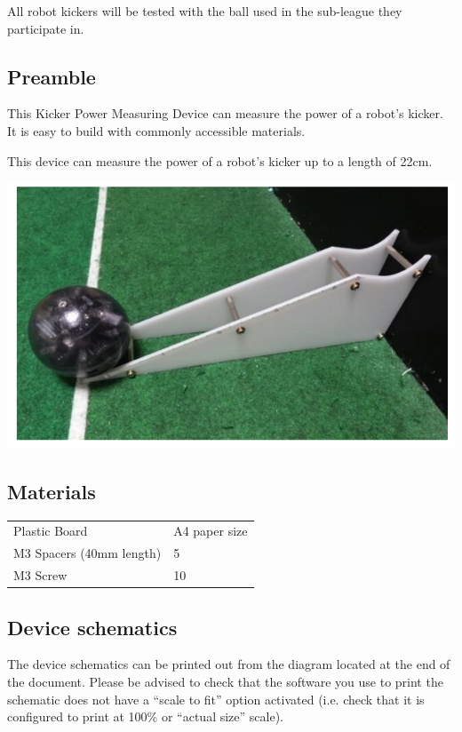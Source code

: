 \documentclass{article}
\begin{document}
All robot kickers will be tested with the ball used in the sub-league they
participate in.

\subsection{Preamble}

This Kicker Power Measuring Device can measure the power of a robot's kicker.
It is easy to build with commonly accessible materials.

This device can measure the power of a robot's kicker up to a length of 22cm.

\includegraphics[width=1\textwidth]{media/image8.png}

\subsection{Materials}

\begin{table}
\begin{tabularx}{\textwidth}{
p{}
p{}}
Plastic Board & A4 paper size \\
M3 Spacers (40mm length) & 5 \\
M3 Screw & 10 \\

\end{tabularx}

\end{table}

\subsection{Device schematics}

The device schematics can be printed out from the diagram located at the end of
the document. Please be advised to check that the software you use to print the
schematic does not have a ``scale to fit'' option activated (i.e. check that it
is configured to print at 100\% or ``actual size'' scale).
\end{document}
